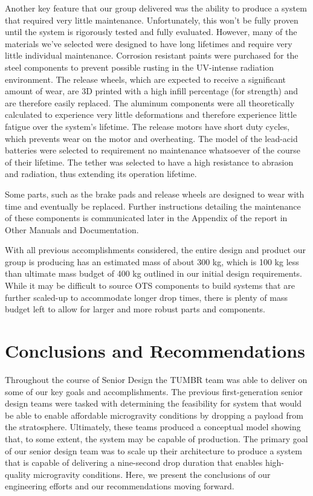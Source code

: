 Another key feature that our group delivered was the ability to produce a system that required very little maintenance. Unfortunately, this won't be fully proven until the system is rigorously tested and fully evaluated. However, many of the materials we've selected were designed to have long lifetimes and require very little individual maintenance. Corrosion resistant paints were purchased for the steel components to prevent possible rusting in the UV-intense radiation environment. The release wheels, which are expected to receive a significant amount of wear, are 3D printed with a high infill percentage (for strength) and are therefore easily replaced. The aluminum components were all theoretically calculated to experience very little deformations and therefore experience little fatigue over the system's lifetime. The release motors have short duty cycles, which prevents wear on the motor and overheating. The model of the lead-acid batteries were selected to requirement no maintenance whatsoever of the course of their lifetime. The tether was selected to have a high resistance to abrasion and radiation, thus extending its operation lifetime. 

Some parts, such as the brake pads and release wheels are designed to wear with time and eventually be replaced. Further instructions detailing the maintenance of these components is communicated later in the Appendix of the report in Other Manuals and Documentation. 

With all previous accomplishments considered, the entire design and product our group is producing has an estimated mass of about 300 kg, which is 100 kg less than ultimate mass budget of 400 kg outlined in our initial design requirements. While it may be difficult to source OTS components to build systems that are further scaled-up to accommodate longer drop times, there is plenty of mass budget left to allow for larger and more robust parts and components. 


\section{Conclusions and Recommendations}

\indent\indent Throughout the course of Senior Design the TUMBR team was able to deliver on some of our key goals and accomplishments. The previous first-generation senior design teams were tasked with determining the feasibility for system that would be able to enable affordable microgravity conditions by dropping a payload from the stratosphere. Ultimately, these teams produced a conceptual model showing that, to some extent, the system may be capable of production. The primary goal of our senior design team was to scale up their architecture to produce a system that is capable of delivering a nine-second drop duration that enables high-quality microgravity conditions. Here, we present the conclusions of our engineering efforts and our recommendations moving forward.


